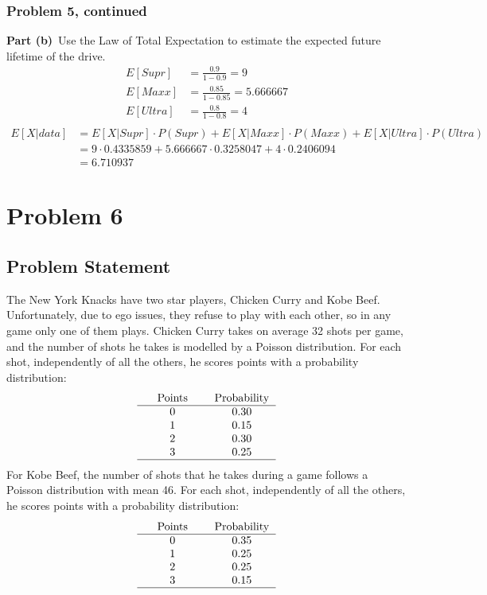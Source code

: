 \documentclass[12pt]{article}
\theoremstyle{definition}
\begin{document}
\newpage
\subsubsection*{Problem 5, continued}

\noindent
{\bf Part (b)}\ Use the Law of Total Expectation to estimate the expected future lifetime of the drive.
\begin{align*}
E[Supr] &= \frac{0.9}{1-0.9} = 9\\
E[Maxx] &= \frac{0.85}{1-0.85} = 5.666667\\
E[Ultra] &= \frac{0.8}{1-0.8} = 4\\
\end{align*}
\begin{align*}
E[X|data] &= E[X|Supr] \cdot P(Supr) + E[X|Maxx] \cdot P(Maxx) + E[X|Ultra] \cdot P(Ultra)\\
&= 9 \cdot 0.4335859 + 5.666667 \cdot 0.3258047 + 4 \cdot 0.2406094\\
&= 6.710937
\end{align*}
\newpage
\section*{Problem 6}


\subsection*{Problem Statement}

The New York Knacks have two star players, Chicken Curry and Kobe Beef. Unfortunately, due to ego issues, they refuse to play with each other, so in any game only one of them plays. Chicken Curry takes on average 32 shots per game, and the number of shots he takes is modelled by a Poisson distribution. For each shot, independently of all the others, he scores points with a probability distribution:
$$
\begin{tabular}{ccccc}
& Points & & Probability\\
\hline
& 0 & & 0.30\\
& 1 & & 0.15\\
& 2 & & 0.30\\
& 3 & & 0.25\\
\hline
\end{tabular}
$$
For Kobe Beef, the number of shots that he takes during a game follows a Poisson distribution with mean 46. For each shot, independently of all the others, he scores points with a probability distribution:
$$
\begin{tabular}{ccccc}
& Points & & Probability\\
\hline
& 0 & & 0.35\\
& 1 & & 0.25\\
& 2 & & 0.25\\
& 3 & & 0.15\\
\hline
\end{tabular}
$$
\end{document}
